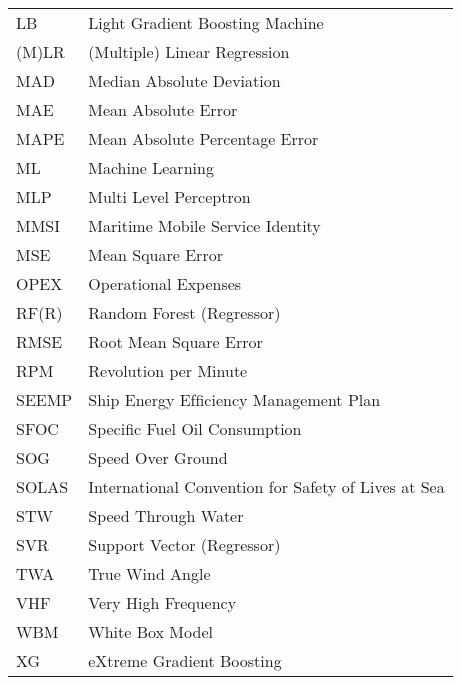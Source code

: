 \begin{longtable}[l]{>{}l<{}l}
LB          & Light Gradient Boosting Machine\\%
(M)LR       & (Multiple) Linear Regression\\%
MAD         & Median Absolute Deviation \\%
MAE         & Mean Absolute Error \\%
MAPE        & Mean Absolute Percentage Error \\%
ML          & Machine Learning\\%
MLP         & Multi Level Perceptron\\%
MMSI        & Maritime Mobile Service Identity \\%
MSE         & Mean Square Error\\%
OPEX        & Operational Expenses\\%
RF(R)       & Random Forest (Regressor)\\%
RMSE        & Root Mean Square Error\\%
RPM         & Revolution per Minute\\%
SEEMP       & Ship Energy Efﬁciency Management Plan\\%
SFOC        & Specific Fuel Oil Consumption \\%
SOG         & Speed Over Ground \\%
SOLAS       & International Convention for Safety of Lives at Sea\\%
STW         & Speed Through Water \\%
SVR         & Support Vector (Regressor)\\%
TWA         & True Wind Angle\\%
VHF         & Very High Frequency\\%
WBM         & White Box Model\\%
XG          & eXtreme Gradient Boosting\\%

\end{longtable}

\setlength{\extrarowheight}{0pt}